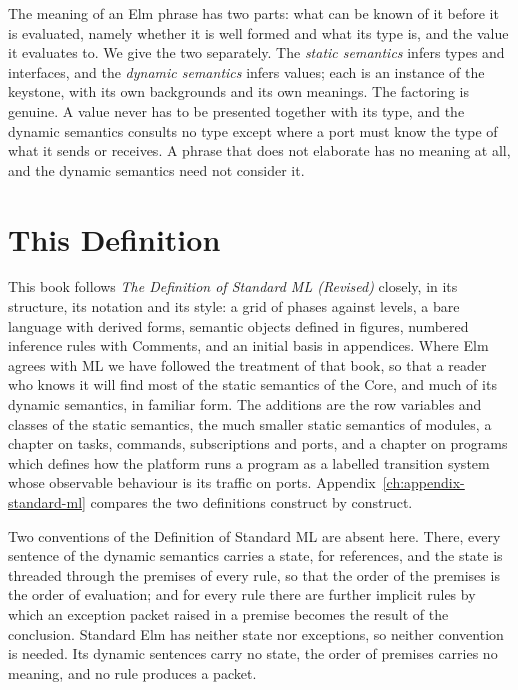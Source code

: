 The meaning of an Elm phrase has two parts: what can be known of it before it
is evaluated, namely whether it is well formed and what its type is, and the
value it evaluates to. We give the two separately. The \emph{static
semantics} infers types and interfaces, and the \emph{dynamic semantics}
infers values; each is an instance of the keystone, with its own backgrounds
and its own meanings. The factoring is genuine. A value never has to be
presented together with its type, and the dynamic semantics consults no type
except where a port must know the type of what it sends or receives. A
phrase that does not elaborate has no meaning at all, and the dynamic
semantics need not consider it.

\section*{This Definition}

This book follows \emph{The Definition of Standard ML (Revised)} closely, in
its structure, its notation and its style: a grid of phases against levels,
a bare language with derived forms, semantic objects defined in figures,
numbered inference rules with Comments, and an initial basis in appendices.
Where Elm agrees with ML we have followed the treatment of that book, so
that a reader who knows it will find most of the static semantics of the
Core, and much of its dynamic semantics, in familiar form. %
The additions are the row variables and classes of the static semantics,
the much smaller static semantics of modules, a chapter on tasks, commands,
subscriptions and ports, and a chapter on programs which defines how the
platform runs a program as a labelled transition system whose observable
behaviour is its traffic on ports. Appendix~\ref{ch:appendix-standard-ml}
compares the two definitions construct by construct.

Two conventions of the Definition of Standard ML are absent here. There,
every sentence of the dynamic semantics carries a state, for references, and
the state is threaded through the premises of every rule, so that the order
of the premises is the order of evaluation; and for every rule there are
further implicit rules by which an exception packet raised in a premise
becomes the result of the conclusion. Standard Elm has neither state nor
exceptions, so neither convention is needed. Its dynamic sentences carry no
state, the order of premises carries no meaning, and no rule produces a
packet. %

